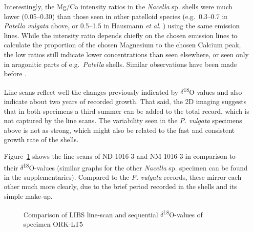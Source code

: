 \documentclass[
  authoryear,
  preprint,
  3p]{elsarticle}
\begin{document}
Interestingly, the Mg/Ca intensity ratios in the \emph{Nacella} sp.
shells were much lower (0.05--0.30) than those seen in other patelloid
species (e.g.~0.3--0.7 in \emph{Patella vulgata} above, or 0.5--1.5 in
Hausmann \emph{et al}. \citeyearpar{Hausmann2023-ih}) using the same
emission lines. While the intensity ratio depends chiefly on the chosen
emission lines to calculate the proportion of the chosen Magnesium to
the chosen Calcium peak, the low ratios still indicate lower
concentrations than seen elsewhere, or seen only in aragonitic parts of
e.g.~\emph{Patella} shells. Similar observations have been made before
\citep{Graniero2017-io}.

Line scans reflect well the changes previously indicated by
\(\delta\)\textsuperscript{18}O values and also indicate about two years
of recorded growth. That said, the 2D imaging suggests that in both
specimens a third summer can be added to the total record, which is not
captured by the line scans. The variability seen in the \emph{P.
vulgata} specimens above is not as strong, which might also be related
to the fast and consistent growth rate of the shells.

Figure~\ref{fig-Nac_Comp} shows the line scans of ND-1016-3 and
NM-1016-3 in comparison to their \(\delta\)\textsuperscript{18}O-values
(similar graphs for the other \emph{Nacella} sp. specimen can be found
in the supplementaries). Compared to the \emph{P. vulgata} records,
these mirror each other much more clearly, due to the brief period
recorded in the shells and its simple make-up.

\begin{figure}


\caption{\label{fig-Nac_Comp}Comparison of LIBS line-scan and sequential
\(\delta\)\textsuperscript{18}O-values of specimen ORK-LT5}

\end{figure}%
\end{document}
